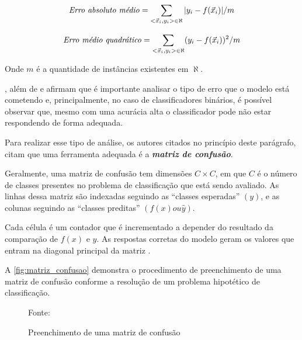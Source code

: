 \begin{equation}\label{erro_absoluto_medio}
\textrm{\textit{Erro absoluto médio}}=\sum_{<\vec{x}_i, y_i> \in \aleph} |y_i - f(\vec{x}_i)|/m
\end{equation}

\begin{equation}\label{erro_quadratico_medio}
\textrm{\textit{Erro médio quadrático}}=\sum_{<\vec{x}_i, y_i> \in \aleph} (y_i - f(\vec{x}_i))^2/m
\end{equation}

Onde $m$ é a quantidade de instâncias existentes em $\aleph$. 

,  além de  e  afirmam que é importante analisar o tipo de erro que o modelo está cometendo e, principalmente, no caso de classificadores binários, é possível observar que, mesmo com uma acurácia alta o classificador pode não estar respondendo de forma adequada. 

Para realizar esse tipo de análise, os autores citados no princípio deste parágrafo, citam que uma ferramenta adequada é a \textit{\textbf{matriz de confusão}}. 

Geralmente, uma matriz de confusão tem dimensões $C \times C$, em que $C$ é o número de classes presentes no problema de classificação que está sendo avaliado. As linhas dessa matriz são indexadas seguindo as ``classes esperadas'' $(y)$, e as colunas seguindo as ``classes preditas'' $(f(x) ou \hat{y})$. 

Cada célula é um contador que é incrementado a depender do resultado da comparação de $f(x)$ e $y$. As respostas corretas do modelo geram os valores que entram na diagonal principal da matriz \cite[p. 130]{Boscarioli2017}.

A \autoref{fig:matriz_confusao} demonstra o procedimento de preenchimento de uma matriz de confusão conforme a resolução de um problema hipotético de classificação.

\begin{figure}[h!]
	\centering
	\caption{Preenchimento de uma matriz de confusão}
	
	{\scriptsize Fonte: }
	\label{fig:matriz_confusao}
\end{figure}

